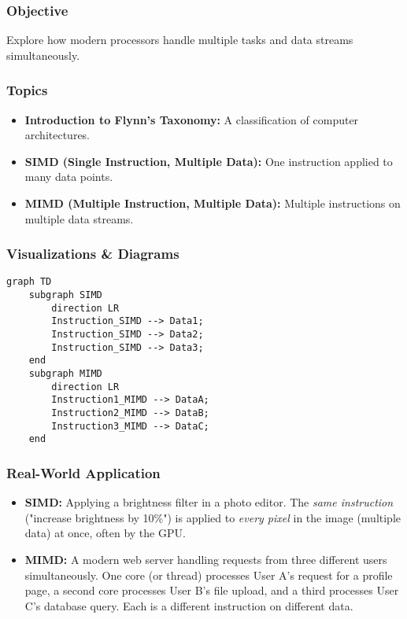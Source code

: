 \documentclass{article}
\begin{document}
\subsubsection{Objective}
Explore how modern processors handle multiple tasks and data streams simultaneously.

\subsubsection{Topics}
\begin{itemize}
    \item \textbf{Introduction to Flynn's Taxonomy:} A classification of computer architectures.
    \item \textbf{SIMD (Single Instruction, Multiple Data):} One instruction applied to many data points.
    \item \textbf{MIMD (Multiple Instruction, Multiple Data):} Multiple instructions on multiple data streams.
\end{itemize}

\subsubsection{Visualizations \& Diagrams}
\begin{verbatim}
graph TD
    subgraph SIMD
        direction LR
        Instruction_SIMD --> Data1;
        Instruction_SIMD --> Data2;
        Instruction_SIMD --> Data3;
    end
    subgraph MIMD
        direction LR
        Instruction1_MIMD --> DataA;
        Instruction2_MIMD --> DataB;
        Instruction3_MIMD --> DataC;
    end
\end{verbatim}

\subsubsection{Real-World Application}
\begin{itemize}
    \item \textbf{SIMD:} Applying a brightness filter in a photo editor. The \textit{same instruction} ("increase brightness by 10\%") is applied to \textit{every pixel} in the image (multiple data) at once, often by the GPU.
    \item \textbf{MIMD:} A modern web server handling requests from three different users simultaneously. One core (or thread) processes User A's request for a profile page, a second core processes User B's file upload, and a third processes User C's database query. Each is a different instruction on different data.
\end{itemize}
\end{document}

